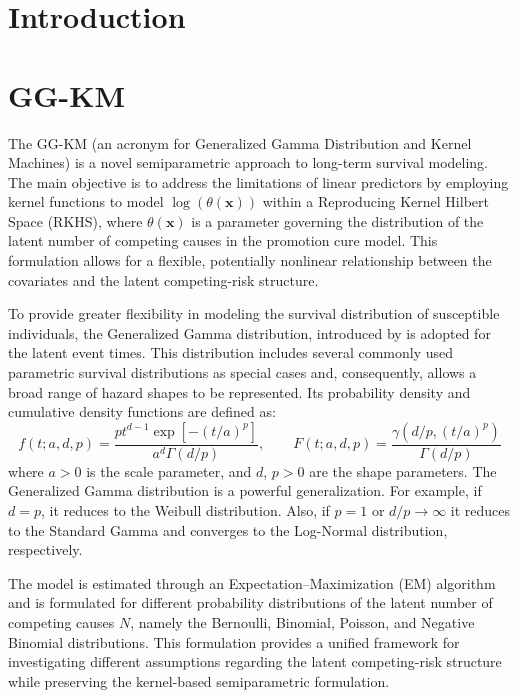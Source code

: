 \section{Introduction}

\section{GG-KM}

The GG-KM (an acronym for Generalized Gamma Distribution and Kernel
Machines) is a novel semiparametric approach to long-term survival
modeling. The main objective is to address the limitations of linear
predictors by employing kernel functions to model
$\log\left(\theta(\mathbf{x})\right)$ within a Reproducing Kernel Hilbert
Space (RKHS), where $\theta(\mathbf{x})$ is a parameter governing the
distribution of the latent number of competing causes in the promotion
cure model. This formulation allows for a flexible, potentially
nonlinear relationship between the covariates and the latent competing-risk
structure.

To provide greater flexibility in modeling the survival distribution of
susceptible individuals, the Generalized Gamma distribution, introduced by 
is adopted for the latent event times. This distribution includes several commonly used
parametric survival distributions as special cases and, consequently,
allows a broad range of hazard shapes to be represented. Its probability density
and cumulative density functions are defined as:
\begin{equation}
f(t; a,d,p)
=
\frac{p t^{d-1}\exp\left[-(t/a)^p\right]}
{a^d\Gamma(d/p)},
\qquad
F(t; a,d,p)
=
\frac{\gamma\left(d/p,(t/a)^p\right)}
{\Gamma(d/p)}
\tag{3}
\end{equation}
where $a> 0$ is the scale parameter, and $d$, $p> 0$ are the shape parameters. The
Generalized Gamma distribution is a powerful generalization. For example, if $d=p$, it reduces
to the Weibull distribution. Also, if $p=1$ or $d/p \to \infty$ it reduces to the
Standard Gamma and converges to the Log-Normal distribution, respectively.


The model is estimated through an Expectation--Maximization (EM) \cite{mclachlan2008algorithm}
algorithm and is formulated for different probability distributions of the
latent number of competing causes $N$, namely the Bernoulli, Binomial,
Poisson, and Negative Binomial distributions. This formulation provides a
unified framework for investigating different assumptions regarding the
latent competing-risk structure while preserving the kernel-based
semiparametric formulation.

